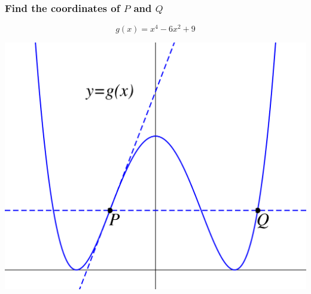 \documentclass[14pt]{beamer}
\begin{document}
	\begin{frame}[t]
		\frametitle{Find the coordinates of $P$ and $Q$}
		\vspace{-.5cm}
		\[
			g(x) = x^{4} - 6x^{2} + 9
		\]

		\medskip
		\begin{center}
			\includegraphics[scale=.4]{G16}
		\end{center}
	\end{frame}
\end{document}
